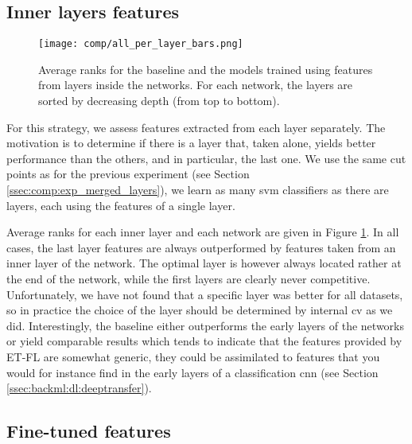\subsection{Inner layers features}
\label{ssec:comp:exp_inner_layers}

\begin{figure}
    \centering
    \texttt{[image: comp/all\_per\_layer\_bars.png]}
    \caption{Average ranks for the baseline and the models trained using features from layers inside the networks. For each network, the layers are sorted by decreasing depth (from top to bottom).}
    \label{fig:comp:res_avg_ranks_per_layer}
\end{figure}
 
For this strategy, we assess features extracted from each layer separately. The motivation is to determine if there is a layer that, taken alone, yields better performance than the others, and in particular, the last one. We use the same cut points as for the previous experiment (see Section \ref{ssec:comp:exp_merged_layers}), we learn as many \acrshort{svm} classifiers as there are layers, each using the features of a single layer.

Average ranks for each inner layer and each network are given in Figure \ref{fig:comp:res_avg_ranks_per_layer}. In all cases, the last layer features are always outperformed by features taken from an inner layer of the network. The optimal layer is however always located rather at the end of the network, while the first layers are clearly never competitive. Unfortunately, we have not found that a specific layer was better for all datasets, so in practice the choice of the layer should be determined by internal \acrlong{cv} as we did. Interestingly, the baseline either outperforms the early layers of the networks or yield comparable results which tends to indicate that the features provided by ET-FL are somewhat generic, \ie they could be assimilated to features that you would for instance find in the early layers of a classification \acrshort{cnn} (see Section \ref{ssec:backml:dl:deeptransfer}). 

\subsection{Fine-tuned features}
\label{ssec:comp:exp_fine_tuning}

